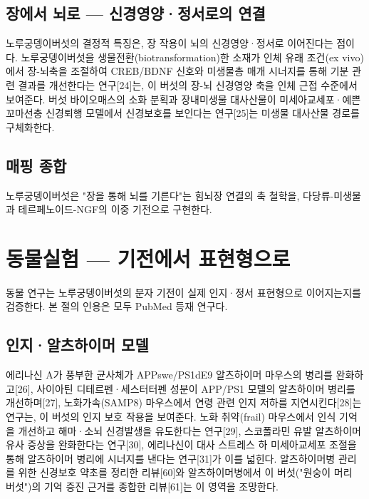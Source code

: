 \documentclass[11pt,oneside]{book}
\begin{document}
\subsection{장에서 뇌로 — 신경영양·정서로의 연결}
노루궁뎅이버섯의 결정적 특징은, 장 작용이 뇌의 신경영양·정서로 이어진다는 점이다. 노루궁뎅이버섯을 생물전환(biotransformation)한 소재가 인체 유래 조건(ex vivo)에서 장-뇌축을 조절하여 CREB/BDNF 신호와 미생물총 매개 시너지를 통해 기분 관련 결과를 개선한다는 연구[24]는, 이 버섯의 장-뇌 신경영양 축을 인체 근접 수준에서 보여준다. 버섯 바이오매스의 소화 분획과 장내미생물 대사산물이 미세아교세포·예쁜꼬마선충 신경퇴행 모델에서 신경보호를 보인다는 연구[25]는 미생물 대사산물 경로를 구체화한다.

\subsection{매핑 종합}
\vspace{2pt}\vspace{3pt}

노루궁뎅이버섯은 "장을 통해 뇌를 기른다"는 힘뇌장 연결의 축 철학을, 다당류-미생물과 테르페노이드-NGF의 이중 기전으로 구현한다.

\section{동물실험 — 기전에서 표현형으로}
동물 연구는 노루궁뎅이버섯의 분자 기전이 실제 인지·정서 표현형으로 이어지는지를 검증한다. 본 절의 인용은 모두 PubMed 등재 연구다.

\subsection{인지·알츠하이머 모델}
에리나신 A가 풍부한 균사체가 APPswe/PS1dE9 알츠하이머 마우스의 병리를 완화하고[26], 사이아틴 디테르펜·세스터터펜 성분이 APP/PS1 모델의 알츠하이머 병리를 개선하며[27], 노화가속(SAMP8) 마우스에서 연령 관련 인지 저하를 지연시킨다[28]는 연구는, 이 버섯의 인지 보호 작용을 보여준다. 노화 취약(frail) 마우스에서 인식 기억을 개선하고 해마·소뇌 신경발생을 유도한다는 연구[29], 스코폴라민 유발 알츠하이머 유사 증상을 완화한다는 연구[30], 에리나신이 대사 스트레스 하 미세아교세포 조절을 통해 알츠하이머 병리에 시너지를 낸다는 연구[31]가 이를 넓힌다. 알츠하이머병 관리를 위한 신경보호 약초를 정리한 리뷰[60]와 알츠하이머병에서 이 버섯("원숭이 머리 버섯")의 기억 증진 근거를 종합한 리뷰[61]는 이 영역을 조망한다.
\end{document}
